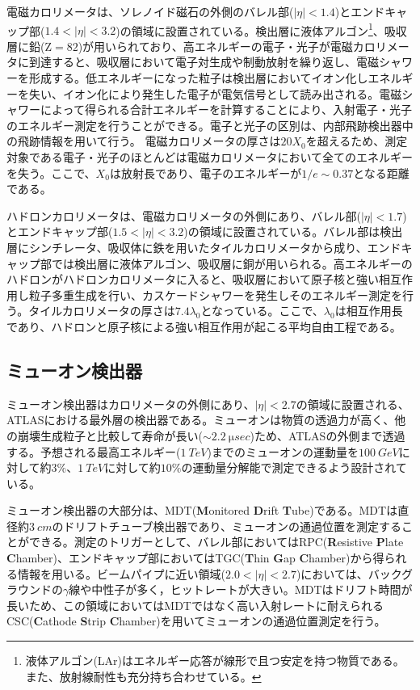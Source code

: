 電磁カロリメータは、ソレノイド磁石の外側のバレル部($|\eta|<1.4$)とエンドキャップ部($1.4<|\eta|<3.2$)の領域に設置されている。検出層に液体アルゴン\footnote{液体アルゴン(LAr)はエネルギー応答が線形で且つ安定を持つ物質である。また、放射線耐性も充分持ち合わせている。}、吸収層に鉛($\mathrm{Z}=82$)が用いられており、高エネルギーの電子・光子が電磁カロリメータに到達すると、吸収層において電子対生成や制動放射を繰り返し、電磁シャワーを形成する。低エネルギーになった粒子は検出層においてイオン化しエネルギーを失い、イオン化により発生した電子が電気信号として読み出される。電磁シャワーによって得られる合計エネルギーを計算することにより、入射電子・光子のエネルギー測定を行うことができる。電子と光子の区別は、内部飛跡検出器中の飛跡情報を用いて行う。
電磁カロリメータの厚さは$20X_0$を超えるため、測定対象である電子・光子のほとんどは電磁カロリメータにおいて全てのエネルギーを失う。ここで、$X_0$は放射長であり、電子のエネルギーが$1/e\sim0.37$となる距離である。

ハドロンカロリメータは、電磁カロリメータの外側にあり、バレル部($|\eta|<1.7$)とエンドキャップ部($1.5<|\eta|<3.2$)の領域に設置されている。バレル部は検出層にシンチレータ、吸収体に鉄を用いたタイルカロリメータから成り、エンドキャップ部では検出層に液体アルゴン、吸収層に銅が用いられる。高エネルギーのハドロンがハドロンカロリメータに入ると、吸収層において原子核と強い相互作用し粒子多重生成を行い、カスケードシャワーを発生しそのエネルギー測定を行う。タイルカロリメータの厚さは$7.4\lambda_0$となっている。ここで、$\lambda_0$は相互作用長であり、ハドロンと原子核による強い相互作用が起こる平均自由工程である。


\subsection{ミューオン検出器}
\label{sec:mumu}
ミューオン検出器はカロリメータの外側にあり、$|\eta|<2.7$の領域に設置される、ATLASにおける最外層の検出器である。ミューオンは物質の透過力が高く、他の崩壊生成粒子と比較して寿命が長い($\sim 2.2\ \si{\micro sec}$)ため、ATLASの外側まで透過する。予想される最高エネルギー($1\ \si{TeV}$)までのミューオンの運動量を$100\ \si{GeV}$に対して約$3\%$、$1\ \si{TeV}$に対して約$10\%$の運動量分解能で測定できるよう設計されている。

ミューオン検出器の大部分は、MDT(\textbf{M}onitored \textbf{D}rift \textbf{T}ube)である。MDTは直径約$3\ \si{cm}$のドリフトチューブ検出器であり、ミューオンの通過位置を測定することができる。測定のトリガーとして、バレル部においてはRPC(\textbf{R}esistive \textbf{P}late \textbf{C}hamber)、エンドキャップ部においてはTGC(\textbf{T}hin \textbf{G}ap \textbf{C}hamber)から得られる情報を用いる。ビームパイプに近い領域($2.0<|\eta|<2.7$)においては、バックグラウンドの$\gamma$線や中性子が多く，ヒットレートが大きい。MDTはドリフト時間が長いため、この領域においてはMDTではなく高い入射レートに耐えられるCSC(\textbf{C}athode \textbf{S}trip \textbf{C}hamber)を用いてミューオンの通過位置測定を行う。



